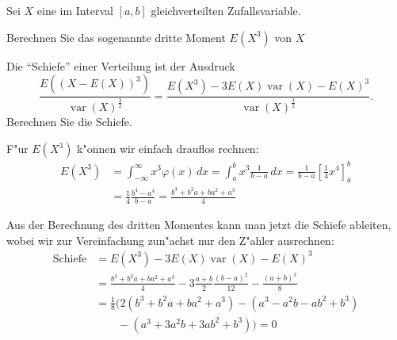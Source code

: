 Sei $X$ eine im Interval $[a,b]$ gleichverteilten Zufallsvariable.
\begin{teilaufgaben}
\item Berechnen Sie das sogenannte dritte Moment $E(X^3)$ von $X$
\item Die ``Schiefe'' einer Verteilung ist der Ausdruck
\[
\frac{E((X-E(X))^3)}{\operatorname{var}(X)^{\frac32}}
=
\frac{E(X^3)-3E(X)\operatorname{var}(X)-E(X)^3}{\operatorname{var}(X)^{\frac32}}.
\]
Berechnen Sie die Schiefe.
\end{teilaufgaben}

\begin{loesung}
\begin{teilaufgaben}
\item
F"ur $E(X^3)$ k"onnen wir einfach drauflos rechnen:
\begin{align*}
E(X^3)
&=
\int_{-\infty}^\infty x^3\varphi(x)\,dx
=
\int_a^bx^3\frac1{b-a}\,dx
=
\frac1{b-a}\left[\frac14x^4\right]_a^b
\\
&=
\frac14\frac{b^4-a^4}{b-a}
=
\frac{b^3+b^2a+ba^2+a^3}{4}
\end{align*}
\item Aus der Berechnung des dritten Momentes kann man jetzt
die Schiefe ableiten, wobei wir zur Vereinfachung zun"achst
nur den Z"ahler ausrechnen:
\begin{align*}
\text{Schiefe}
&=
E(X^3)-3E(X)\operatorname{var}(X)-E(X)^3
\\
&=
\frac{b^3+b^2a+ba^2+a^3}{4}
-3\frac{a+b}2\frac{(b-a)^2}{12}
-\frac{(a+b)^3}{8}
\\
&=
\frac18\bigl(
2(b^3+b^2a+ba^2+a^3)
-(a^3-a^2b-ab^2+b^3)
\\
&\qquad
-(a^3+3a^2b+3ab^2+b^3)
\bigr)
=0
\end{align*}
\end{teilaufgaben}
\end{loesung}

